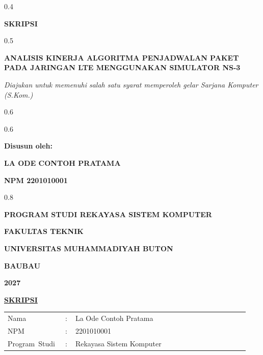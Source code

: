 \thispagestyle{empty}
\begin{ruang}{0.4}\end{ruang}
\begin{sampulbesar}
\textbf{SKRIPSI}
\end{sampulbesar}
\begin{ruang}{0.5}\end{ruang}
\begin{sampulbesar}
\textbf{ANALISIS KINERJA ALGORITMA PENJADWALAN PAKET PADA JARINGAN LTE MENGGUNAKAN SIMULATOR NS-3}
\end{sampulbesar}
\begin{sampulsedang}
\textit{Diajukan untuk memenuhi salah satu syarat memperoleh gelar Sarjana Komputer (S.Kom.)}
\end{sampulsedang}
\begin{ruang}{0.6}\end{ruang}
\begin{tengah}
\logo{4.5cm}
\end{tengah}
\begin{ruang}{0.6}\end{ruang}
\begin{sampulsedang}
\textbf{Disusun oleh:}

\textbf{LA ODE CONTOH PRATAMA}

\textbf{NPM 2201010001}
\end{sampulsedang}
\begin{ruang}{0.8}\end{ruang}
\begin{sampulsedang}
\textbf{PROGRAM STUDI REKAYASA SISTEM KOMPUTER}

\textbf{FAKULTAS TEKNIK}

\textbf{UNIVERSITAS MUHAMMADIYAH BUTON}

\textbf{BAUBAU}

\textbf{2027}
\end{sampulsedang}
\begin{halamanbaru}\end{halamanbaru}

\thispagestyle{empty}
\begin{tengah}
\textbf{\underline{SKRIPSI}}
\end{tengah}

\begin{tanpagaris}
\begin{longtable}{@{}p{0.22\linewidth}p{0.04\linewidth}p{0.68\linewidth}@{}}
Nama & : & La Ode Contoh Pratama \\[6pt]
NPM & : & 2201010001 \\[6pt]
\mbox{Program Studi} & : & Rekayasa Sistem Komputer \\
\end{longtable}
\end{tanpagaris}

